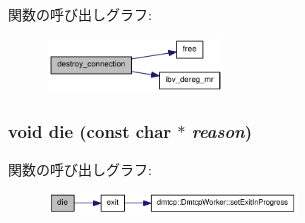 関数の呼び出しグラフ:\nopagebreak
\begin{figure}[H]
\begin{center}
\leavevmode
\includegraphics[width=131pt]{rdma-common_8h_a54feeefad62ea6509ced24a1a06a7a6e_cgraph}
\end{center}
\end{figure}
\hypertarget{rdma-common_8h_aac69fbddfabaad6d61082ad9e6f94505}{
\subsubsection[{die}]{\setlength{\rightskip}{0pt plus 5cm}void die (const char $\ast$ {\em reason})}}
\label{rdma-common_8h_aac69fbddfabaad6d61082ad9e6f94505}


関数の呼び出しグラフ:\nopagebreak
\begin{figure}[H]
\begin{center}
\leavevmode
\includegraphics[width=187pt]{rdma-common_8h_aac69fbddfabaad6d61082ad9e6f94505_cgraph}
\end{center}
\end{figure}


